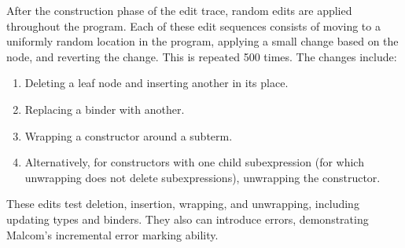 \documentclass[acmsmall,dvipsnames,10pt,nonacm]{acmart}\settopmatter{printfolios=true} %
\begin{document}
After the construction phase of the edit trace, random edits are applied throughout the program. Each of these edit sequences consists of moving to a uniformly random location in the program, applying a small change based on the node, and reverting the change. This is repeated 500 times. The changes include:
\begin{enumerate}
    \item Deleting a leaf node and inserting another in its place.
    \item Replacing a binder with another.
    \item Wrapping a constructor around a subterm.
    \item Alternatively, for constructors with one child subexpression (for which unwrapping does not delete subexpressions), unwrapping the constructor.
\end{enumerate}
These edits test deletion, insertion, wrapping, and unwrapping, including updating types and binders. They also can introduce errors, demonstrating Malcom's incremental error marking ability.
\end{document}
